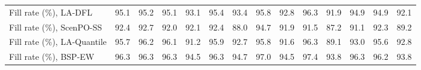 \begin{tabular}{lrrrrrrrrrrrrr}
Fill rate (\%), LA-DFL & 95.1 & 95.2 & 95.1 & 93.1 & 95.4 & 93.4 & 95.8 & 92.8 & 96.3 & 91.9 & 94.9 & 94.9 & 92.1 \\
Fill rate (\%), ScenPO-SS & 92.4 & 92.7 & 92.0 & 92.1 & 92.4 & 88.0 & 94.7 & 91.9 & 91.5 & 87.2 & 91.1 & 92.3 & 89.2 \\
Fill rate (\%), LA-Quantile & 95.7 & 96.2 & 96.1 & 91.2 & 95.9 & 92.7 & 95.8 & 91.6 & 96.3 & 89.1 & 93.0 & 95.6 & 92.8 \\
Fill rate (\%), BSP-EW & 96.3 & 96.3 & 96.3 & 94.5 & 96.3 & 94.7 & 97.0 & 94.5 & 97.4 & 93.8 & 96.3 & 96.2 & 93.8 \\
\bottomrule
\end{tabular}
